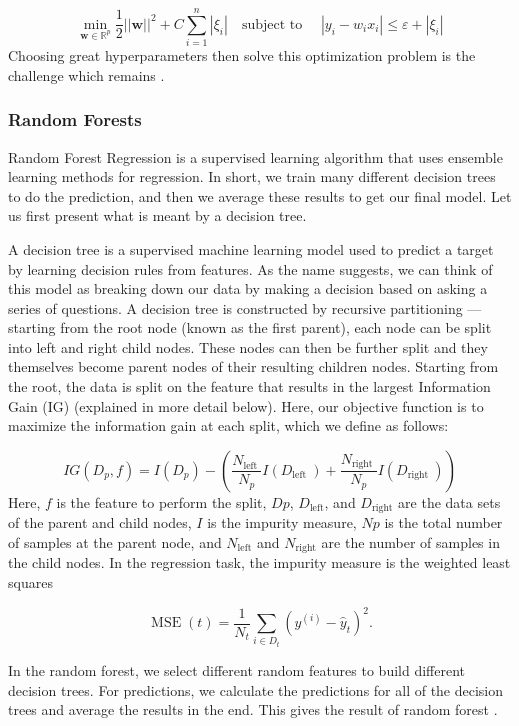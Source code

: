 \documentclass[twoside]{report}
\begin{document}
\begin{spacing}{1}
\[
\min _{\boldsymbol{w} \in \mathbb{R}^{p}} \frac{1}{2}|| \boldsymbol{w}||^{2}+C \sum_{i=1}^{n}\left|\xi_{i}\right| \quad \text{subject to } \quad \left|y_{i}-w_{i} x_{i}\right| \leq \varepsilon+\left|\xi_{i}\right|
\]
Choosing great hyperparameters then solve this optimization problem is the challenge which remains \cite{noble2006support}.


\subsubsection{Random Forests}
Random Forest Regression is a supervised learning algorithm that uses ensemble learning methods for regression. In short, we train many different decision trees to do the prediction, and then we average these results to get our final model. Let us first present what is meant by a decision tree. 

A decision tree is a supervised machine learning model used to predict a target by learning decision rules from features. As the name suggests, we can think of this model as breaking down our data by making a decision based on asking a series of questions. A decision tree is constructed by recursive partitioning — starting from the root node (known as the first parent), each node can be split into left and right child nodes. These nodes can then be further split and they themselves become parent nodes of their resulting children nodes. Starting from the root, the data is split on the feature that results in the largest Information Gain (IG) (explained in more detail below). Here, our objective function is to maximize the information gain at each split, which we define as follows:


$$
I G\left(D_{p}, f\right)=I\left(D_{p}\right)-\left(\frac{N_{\text {left }}}{N_{p}} I\left(D_{\text {left }}\right)+\frac{N_{\text {right }}}{N_{p}} I\left(D_{\text {right }}\right)\right)
$$
Here, $f$ is the feature to perform the split, $Dp$, $D_{\text{left}}$, and $D_{\text{right}}$ are the data sets of the parent and child nodes, $I$ is the impurity measure, $Np$ is the total number of samples at the parent node, and $N_{\text{left}}$ and $N_{\text{right}}$ are the number of samples in the child nodes. In the regression task, the impurity measure is the weighted least squares

\[
\operatorname{MSE}(t)=\frac{1}{N_{t}} \sum_{i \in D_{t}}\left(y^{(i)}-\hat{y}_{t}\right)^{2}.
\]

In the random forest, we select different random features to build different decision trees. For predictions, we calculate the predictions for all of the decision trees and average the results in the end. This gives the result of random forest \cite{segal2004machine}.






\end{spacing}
\end{document}
